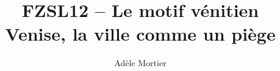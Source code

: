 \documentclass[a4paper,10pt]{article}
\title{FZSL12 -- Le motif vénitien\\
	Venise, la ville comme un piège}
\author{Adèle Mortier}
\begin{document}
\maketitle
\cite{Proust1927}

\medskip


\end{document}
